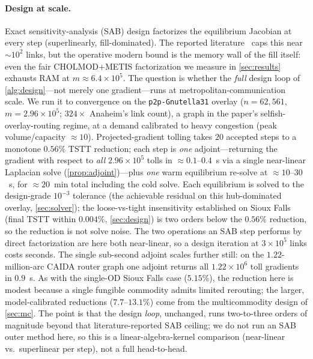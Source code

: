 \documentclass[ijoc]{informs3}
\begin{document}
\paragraph{Design at scale.} Exact sensitivity-analysis (SAB) design factorizes the equilibrium Jacobian at
every step (superlinearly, fill-dominated). The reported literature~\citep{tobinfriesz1988,jp2007,chiou2005} caps
this near ${\sim}10^2$ links, but the operative modern bound is the memory wall of the fill itself: even the fair
CHOLMOD$+$METIS factorization we measure in \cref{sec:results} exhausts RAM at $m{\approx}6.4\times10^5$. The
question is whether the
\emph{full} design loop of \cref{alg:design}---not merely one gradient---runs at metropolitan-communication
scale. We run it to convergence on the \texttt{p2p-Gnutella31} overlay ($n=62{,}561$, $m=2.96\times10^5$; $324\times$
Anaheim's link count), a graph in the paper's selfish-overlay-routing regime, at a demand calibrated to
heavy congestion (peak volume/capacity ${\approx}10$). Projected-gradient tolling takes $20$ accepted steps to
a monotone $0.56\%$ TSTT reduction; each step is \emph{one} adjoint---returning the gradient with respect to
\emph{all} $2.96\times10^5$ tolls in ${\approx}0.1$--$0.4$~s via a single near-linear Laplacian solve
(\cref{prop:adjoint})---plus \emph{one} warm equilibrium re-solve at ${\approx}10$--$30$~s, for ${\approx}20$~min
total including the cold solve. Each equilibrium is solved to the design-grade $10^{-3}$ tolerance (the achievable
residual on this hub-dominated overlay, \cref{sec:solver}); the loose-vs-tight insensitivity established on Sioux
Falls (final TSTT within $0.004\%$, \cref{sec:design}) is two orders below the $0.56\%$ reduction, so the
reduction is not solve noise. The two operations an SAB step performs by direct factorization are here both
near-linear, so a design iteration at $3\times10^5$ links costs seconds. The single sub-second adjoint scales
further still: on the $1.22$-million-arc CAIDA router graph one adjoint returns all $1.22\times10^6$ toll
gradients in $0.9$~s. As with the single-OD Sioux Falls case ($5.15\%$), the reduction here is modest because a
single fungible commodity admits limited rerouting; the larger, model-calibrated reductions ($7.7$--$13.1\%$)
come from the multicommodity design of \cref{sec:mc}. The point is that the design \emph{loop}, unchanged, runs
two-to-three orders of magnitude beyond that literature-reported SAB ceiling; we do not run an SAB outer method
here, so this is a linear-algebra-kernel comparison (near-linear vs.\ superlinear per step), not a full
head-to-head.
\end{document}
